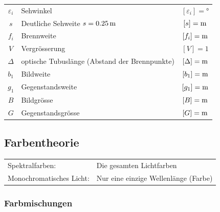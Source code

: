 \begin{tabular}{c l c}
	$\varepsilon_i$ & Sehwinkel & $[\varepsilon_i] =$° \\
	$s$ & Deutliche Sehweite $s =0.25 \, \mathrm{m}$ & $[s] = \mathrm{m}$ \\
	$f_i$ & Brennweite & $[f_i] = \mathrm{m}$ \\
	$V$ & Vergrösserung & $[V] = 1$ \\
	$\Delta$ & optische Tubuslänge (Abstand der Brennpunkte) & $[\Delta] = \mathrm{m}$ \\
	$b_1$ & Bildweite & $[b_1] = \mathrm{m}$ \\
	$g_1$ & Gegenstandsweite & $[g_1] = \mathrm{m}$ \\
	$B$ & Bildgrösse & $[B] = \mathrm{m}$ \\
	$G$ & Gegenstandsgrösse & $[G] = \mathrm{m}$
\end{tabular}






\subsection{Farbentheorie}

\begin{tabular}{ll}
Spektralfarben: &  Die gesamten Lichtfarben \\
Monochromatisches Licht: & Nur eine einzige Wellenlänge (Farbe) 
\end{tabular}



\subsubsection{Farbmischungen}

